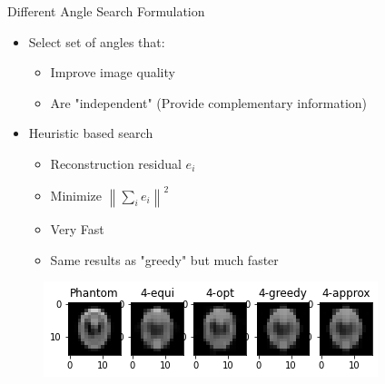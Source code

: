 \documentclass[english,aspectratio=43]{beamer}
\DeclareMathOperator*{\argmin}{arg\,min}
\newcommand{\norm}[1]{\left\lVert#1\right\rVert}
\begin{document}
            
            


\begin{frame}{Different Angle Search Formulation}
	\begin{itemize}
	    \setlength\itemsep{2em}
		    
		\item Select set of angles that:
	    \begin{itemize}
    		\item Improve image quality
    		\item Are "independent" (Provide complementary information)
            
    	\end{itemize}
        
        \item Heuristic based search
        \begin{itemize}
    		\item Reconstruction residual $e_i$
    	    \item Minimize $\norm{\sum_i e_i}^2$
    	    \item Very Fast
    	    \item Same results as "greedy" but much faster
            
    	\end{itemize}
        
	\end{itemize}
	
	\begin{figure}
    \includegraphics[scale=0.9]{Figs/plot_recon_compare3.png}
    \end{figure}
\end{frame}
\end{document}
